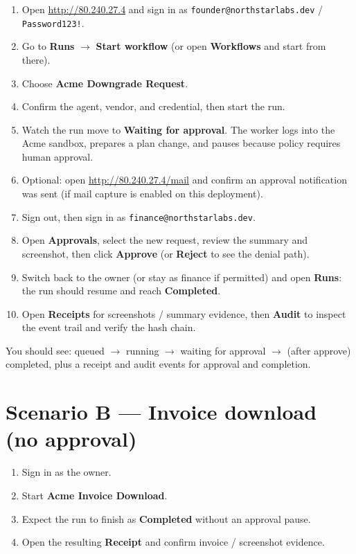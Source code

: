 \documentclass[11pt,a4paper]{article}
\newcommand{\DemoAppUrl}{http://80.240.27.4}
\newcommand{\DemoMailUrl}{http://80.240.27.4/mail}
\newcommand{\DemoPassword}{Password123!}
\newcommand{\ui}[1]{\textbf{#1}}
\newcommand{\email}[1]{\texttt{#1}}
\begin{document}
\begin{enumerate}[leftmargin=1.3em]
  \item Open \url{\DemoAppUrl} and sign in as
        \email{founder@northstarlabs.dev} / \texttt{\DemoPassword}.
  \item Go to \ui{Runs} $\rightarrow$ \ui{Start workflow}
        (or open \ui{Workflows} and start from there).
  \item Choose \textbf{Acme Downgrade Request}.
  \item Confirm the agent, vendor, and credential, then start the run.
  \item Watch the run move to \textbf{Waiting for approval}.
        The worker logs into the Acme sandbox, prepares a plan change, and
        pauses because policy requires human approval.
  \item Optional: open \url{\DemoMailUrl} and confirm an approval notification
        was sent (if mail capture is enabled on this deployment).
  \item Sign out, then sign in as
        \email{finance@northstarlabs.dev}.
  \item Open \ui{Approvals}, select the new request, review the summary and
        screenshot, then click \ui{Approve} (or \ui{Reject} to see the denial path).
  \item Switch back to the owner (or stay as finance if permitted) and open
        \ui{Runs}: the run should resume and reach \textbf{Completed}.
  \item Open \ui{Receipts} for screenshots / summary evidence, then \ui{Audit}
        to inspect the event trail and verify the hash chain.
\end{enumerate}

\begin{callout}
  You should see: queued $\rightarrow$ running $\rightarrow$ waiting for approval
  $\rightarrow$ (after approve) completed, plus a receipt and audit events for
  approval and completion.
\end{callout}

\section{Scenario B --- Invoice download (no approval)}

\begin{enumerate}[leftmargin=1.3em]
  \item Sign in as the owner.
  \item Start \textbf{Acme Invoice Download}.
  \item Expect the run to finish as \textbf{Completed} without an approval pause.
  \item Open the resulting \ui{Receipt} and confirm invoice / screenshot evidence.
\end{enumerate}
\end{document}
